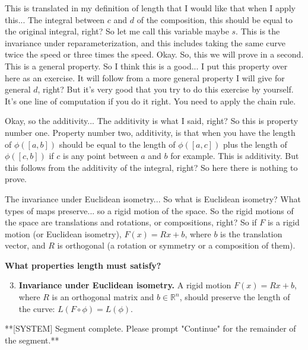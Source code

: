 \begin{spoken_clean}[00:15:30 - 00:16:30]
This is translated in my definition of length that I would like that when I apply this... The integral between $c$ and $d$ of the composition, this should be equal to the original integral, right? So let me call this variable maybe $s$. This is the invariance under reparameterization, and this includes taking the same curve twice the speed or three times the speed. Okay. So, this we will prove in a second. This is a general property. So I think this is a good... I put this property over here as an exercise. It will follow from a more general property I will give for general $d$, right? But it's very good that you try to do this exercise by yourself. It's one line of computation if you do it right. You need to apply the chain rule.

Okay, so the additivity... The additivity is what I said, right? So this is property number one. Property number two, additivity, is that when you have the length of $\phi([a,b])$ should be equal to the length of $\phi([a,c])$ plus the length of $\phi([c,b])$ if $c$ is any point between $a$ and $b$ for example. This is additivity. But this follows from the additivity of the integral, right? So here there is nothing to prove.

The invariance under Euclidean isometry... So what is Euclidean isometry? What types of maps preserve... so a rigid motion of the space. So the rigid motions of the space are translations and rotations, or compositions, right? So if $F$ is a rigid motion (or Euclidean isometry), $F(x) = Rx + b$, where $b$ is the translation vector, and $R$ is orthogonal (a rotation or symmetry or a composition of them).
\end{spoken_clean}

\begin{math_stroke}
\textbf{What properties length must satisfy?}
\begin{enumerate}
    \setcounter{enumi}{2}
    \item \textbf{Invariance under Euclidean isometry.} A rigid motion $F(x) = Rx + b$, where $R$ is an orthogonal matrix and $b \in \mathbb{R}^n$, should preserve the length of the curve: $L(F \circ \phi) = L(\phi)$.
\end{enumerate}
\end{math_stroke}

**[SYSTEM] Segment complete. Please prompt "Continue" for the remainder of the segment.**



